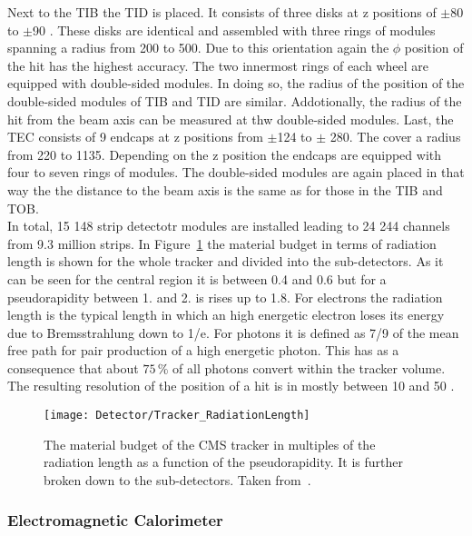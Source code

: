 Next to the TIB the TID is placed. It consists of three disks at z positions of $\pm{}$80 to $\pm$90\cm{} . These disks are identical and assembled with three rings of modules spanning a radius from 200 to 500\mm{}. Due to this orientation again the $\phi{}$ position of the hit has the highest accuracy. The two innermost rings of each wheel are equipped with double-sided modules. In doing so, the radius of the position of the double-sided modules of TIB and TID are similar. Addotionally, the radius of the hit from the beam axis can be measured at thw double-sided modules. Last, the TEC consists of 9 endcaps at z positions from $\pm{}$124 to $\pm{}$ 280\cm{}. The cover a radius from 220 to 1135\mm{}. Depending on the z position the endcaps are equipped with four to seven rings of modules. The double-sided modules are again placed in that way the the distance to the beam axis is the same as for those in the TIB and TOB. \\
In total, 15 148 strip detectotr modules are installed leading to 24 244 channels from 9.3 million strips. In Figure~\ref{plot:LHCCMSTrackerRadiationLength} the material budget in terms of radiation length is shown for the whole tracker and divided into the sub-detectors. As it can be seen for the central region it is between 0.4 and 0.6 but for a pseudorapidity between 1. and 2. is rises up to 1.8. For electrons the radiation length is the typical length in which an high energetic electron loses its energy due to Bremsstrahlung down to 1/e. For photons it is defined as 7/9 of the mean free path for pair production of a high energetic photon. This has as a consequence that about $75\,\%$ of all photons convert within the tracker volume.\\
The resulting resolution of the position of a hit is in mostly between 10 and 50\mum{} \cite{CMS-PAPER-TRK-11-001}.

\begin{figure}[!Hhtb]
    \centering
    \texttt{[image: Detector/Tracker\_RadiationLength]}
    \caption[Material budget of the CMS Tracker]{The material budget of the CMS tracker in multiples of the radiation length as a function of the pseudorapidity. It is further broken down to the sub-detectors. Taken from~. \label{plot:LHCCMSTrackerRadiationLength}}
\end{figure}

\subsubsection{Electromagnetic Calorimeter}

